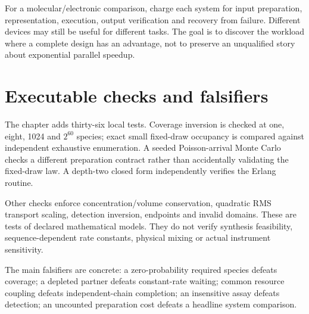 
For a molecular/electronic comparison, charge each system for input preparation,
representation, execution, output verification and recovery from failure.
Different devices may still be useful for different tasks. The goal is to discover
the workload where a complete design has an advantage, not to preserve an
unqualified story about exponential parallel speedup.

\section{Executable checks and falsifiers}
The chapter adds thirty-six local tests. Coverage inversion is checked at one,
eight, 1024 and $2^{60}$ species; exact small fixed-draw occupancy is compared
against independent exhaustive enumeration. A seeded Poisson-arrival Monte Carlo
checks a different preparation contract rather than accidentally validating the
fixed-draw law. A depth-two closed form independently verifies the Erlang routine.

Other checks enforce concentration/volume conservation, quadratic RMS transport
scaling, detection inversion, endpoints and invalid domains. These are tests of
declared mathematical models. They do not verify synthesis feasibility,
sequence-dependent rate constants, physical mixing or actual instrument sensitivity.

The main falsifiers are concrete: a zero-probability required species defeats
coverage; a depleted partner defeats constant-rate waiting; common resource
coupling defeats independent-chain completion; an insensitive assay defeats
detection; an uncounted preparation cost defeats a headline system comparison.

